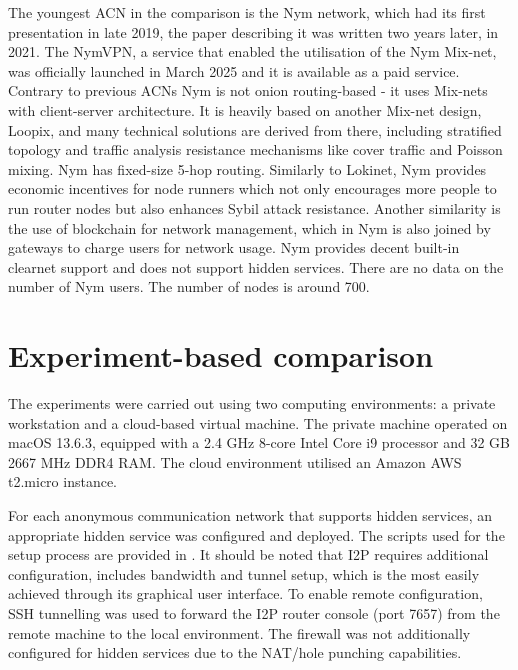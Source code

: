 The youngest ACN in the comparison is the Nym network, which had its first presentation in late 2019, the paper describing it was written two years later, in 2021. The NymVPN, a service that enabled the utilisation of the Nym Mix-net, was officially launched in March 2025 and it is available as a paid service. Contrary to previous ACNs Nym is not onion routing-based - it uses Mix-nets with client-server architecture. It is heavily based on another Mix-net design, Loopix, and many technical solutions are derived from there, including stratified topology and traffic analysis resistance mechanisms like cover traffic and Poisson mixing. Nym has fixed-size 5-hop routing. Similarly to Lokinet, Nym provides economic incentives for node runners which not only encourages more people to run router nodes but also enhances Sybil attack resistance. Another similarity is the use of blockchain for network management, which in Nym is also joined by gateways to charge users for network usage. Nym provides decent built-in clearnet support and does not support hidden services. There are no data on the number of Nym users. The number of nodes is around 700.


\section{Experiment-based comparison}

The experiments were carried out using two computing environments: a private workstation and a cloud-based virtual machine. The private machine operated on macOS 13.6.3, equipped with a 2.4 GHz 8-core Intel Core i9 processor and 32 GB 2667 MHz DDR4 RAM. The cloud environment utilised an Amazon AWS t2.micro instance.

For each anonymous communication network that supports hidden services, an appropriate hidden service was configured and deployed. The scripts used for the setup process are provided in . It should be noted that I2P requires additional configuration, includes bandwidth and tunnel setup, which is the most easily achieved through its graphical user interface. To enable remote configuration, SSH tunnelling was used to forward the I2P router console (port 7657) from the remote machine to the local environment. The firewall was not additionally configured for hidden services due to the NAT/hole punching capabilities.

